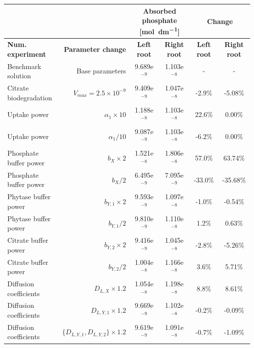 \documentclass[11pt]{article}
\numberwithin{equation}{section}
\begin{document}

\begin{table}[h]
\begin{center}

\fontsize{9.5}{7}\selectfont
\setlength{\tabcolsep}{5.pt}
\def\arraystretch{1.5}
\begin{tabular}{lrcccc}
\toprule
 & & \multicolumn{2}{c}{\textbf{Absorbed phosphate [\si{mol .dm^{-1}}]}} & \multicolumn{2}{c}{\textbf{Change}} \\
 \hline
  \textbf{Num. experiment} & \textbf{Parameter change} & \textbf{Left root} & \textbf{Right root} & \textbf{Left root}  & \textbf{Right root}\\
 \hline 
Benchmark solution & Base parameters & 9.689e$^{-9}$ &  1.103e$^{-8}$& - &- \\
Citrate biodegradation & $V_{max}=2.5 \times 10^{-9}$ & 9.409e$^{-9}$ & 1.047e$^{-8}$ & -2.9\% & -5.08\%\\
Uptake power& $\alpha_1 \times 10$ & 1.188e$^{-8}$ & 1.103e$^{-8}$ & 22.6\% & 0.00\% \\
Uptake power & $\alpha_1 / 10$  & 9.087e$^{-9}$ & 1.103e$^{-8}$ & -6.2\% & 0.00\% \\
Phosphate buffer power & $b_X \times 2$ & 1.521e$^{-8}$ & 1.806e$^{-8}$ & 57.0\% & 63.74\% \\
Phosphate buffer power & $b_X / 2$  & 6.495e$^{-9}$ & 7.095e$^{-9}$ & -33.0\% & -35.68\% \\
Phytase buffer power & $b_{Y,1} \times 2$ &  9.593e$^{-9}$ & 1.097e$^{-8}$ & -1.0\% & -0.54\%  \\
Phytase buffer power & $b_{Y,1} / 2$ & 9.810e$^{-9}$ & 1.110e$^{-8}$ & 1.2\% & 0.63\%   \\
Citrate buffer power & $b_{Y,2} \times 2$ &  9.416e$^{-9}$ & 1.045e$^{-8}$ & -2.8\% & -5.26\% \\
Citrate buffer power & $b_{Y,2} / 2$ & 1.004e$^{-8}$ & 1.166e$^{-8}$ & 3.6\% & 5.71\% \\
Diffusion coefficients & $D_{L,X}\times 1.2$ &  1.054e$^{-8}$ & 1.198e$^{-8}$ & 8.8\% & 8.61\% \\
Diffusion coefficients & $D_{L,Y,1}\times 1.2$ & 9.669e$^{-9}$ & 1.102e$^{-8}$ & -0.2\% & -0.09\% \\
Diffusion coefficients & $\{D_{L,Y,1}, D_{L,Y,2} \}\times 1.2$ & 9.619e$^{-9}$& 1.091e$^{-8}$ & -0.7\% & -1.09\% \\

\end{tabular}
\end{center}
\end{table}
\end{document}

